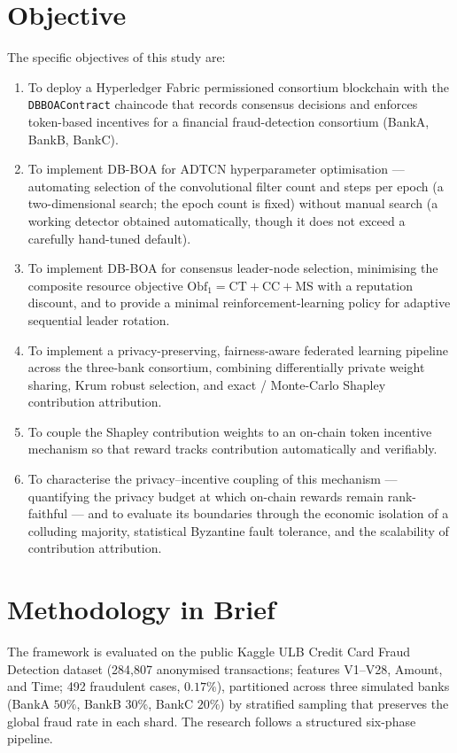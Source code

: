 \section{Objective}
The specific objectives of this study are:

\begin{enumerate}
  \item To deploy a Hyperledger Fabric permissioned consortium blockchain with the \texttt{DBBOAContract} chaincode that records consensus decisions and enforces token-based incentives for a financial fraud-detection consortium (BankA, BankB, BankC).
  \item To implement DB-BOA for ADTCN hyperparameter optimisation — automating selection of the convolutional filter count and steps per epoch (a two-dimensional search; the epoch count is fixed) without manual search (a working detector obtained automatically, though it does not exceed a carefully hand-tuned default).
  \item To implement DB-BOA for consensus leader-node selection, minimising the composite resource objective $\text{Obf}_1 = \text{CT} + \text{CC} + \text{MS}$ with a reputation discount, and to provide a minimal reinforcement-learning policy for adaptive sequential leader rotation.
  \item To implement a privacy-preserving, fairness-aware federated learning pipeline across the three-bank consortium, combining differentially private weight sharing, Krum robust selection, and exact / Monte-Carlo Shapley contribution attribution.
  \item To couple the Shapley contribution weights to an on-chain token incentive mechanism so that reward tracks contribution automatically and verifiably.
  \item To characterise the privacy--incentive coupling of this mechanism — quantifying the privacy budget at which on-chain rewards remain rank-faithful — and to evaluate its boundaries through the economic isolation of a colluding majority, statistical Byzantine fault tolerance, and the scalability of contribution attribution.
\end{enumerate}

\section{Methodology in Brief}
The framework is evaluated on the public Kaggle ULB Credit Card Fraud Detection dataset (284{,}807 anonymised transactions; features V1--V28, Amount, and Time; 492 fraudulent cases, $0.17\%$)\cite{ulb2018}, partitioned across three simulated banks (BankA $50\%$, BankB $30\%$, BankC $20\%$) by stratified sampling that preserves the global fraud rate in each shard. The research follows a structured six-phase pipeline.

